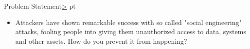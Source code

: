\documentclass[12pt]{extarticle}
\newenvironment{instructionblock}{\Large\bgroup}{\egroup}
\begin{document}

\pagebreak
\tableofcontents


\pagebreak
{}
\setcounter{section}{1}
\begin{slide}{Problem Statement}{\hyperref[slide 2]{\textgreater}}
	 pt
	\begin{instructionblock}
		\begin{itemize}
			\item Attackers have shown remarkable success with so called "social engineering" attacks, fooling people into giving them unauthorized access to data, systems and other assets. How do you prevent it from happening?
		\end{itemize}
	\end{instructionblock}
\end{slide}
\end{document}
